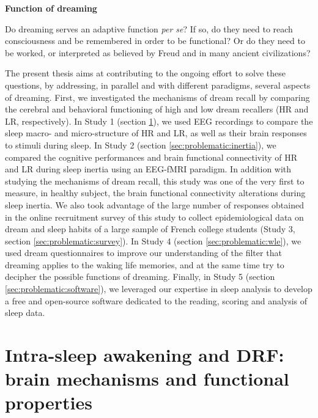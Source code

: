 \textbf{Function of dreaming}
\begin{my_list_item}
	\item Do dreaming serves an adaptive function \emph{per se}? If so, do they need to reach consciousness and be remembered in order to be functional? Or do they need to be worked, or interpreted as believed by Freud and in many ancient civilizations?
\end{my_list_item}

The present thesis aims at contributing to the ongoing effort to solve these questions, by addressing, in parallel and with different paradigms, several aspects of dreaming. First, we investigated the mechanisms of dream recall by comparing the cerebral and behavioral functioning of high and low dream recallers (HR and LR, respectively). In Study 1 (section \ref{sec:problematic:arousals}), we used EEG recordings to compare the sleep macro- and micro-structure of HR and LR, as well as their brain responses to stimuli during sleep. In Study 2 (section \ref{sec:problematic:inertia}), we compared the cognitive performances and brain functional connectivity of HR and LR during sleep inertia using an EEG-fMRI paradigm. In addition with studying the mechanisms of dream recall, this study was one of the very first to measure, in healthy subject, the brain functional connectivity alterations during sleep inertia. We also took advantage of the large number of responses obtained in the online recruitment survey of this study to collect epidemiological data on dream and sleep habits of a large sample of French college students (Study 3, section \ref{sec:problematic:survey}). In Study 4 (section \ref{sec:problematic:wle}), we used dream questionnaires to improve our understanding of the filter that dreaming applies to the waking life memories, and at the same time try to decipher the possible functions of dreaming. Finally, in Study 5 (section \ref{sec:problematic:software}), we leveraged our expertise in sleep analysis to develop a free and open-source software dedicated to the reading, scoring and analysis of sleep data.

\section{Intra-sleep awakening and DRF: brain mechanisms and functional properties}
\label{sec:problematic:arousals}

